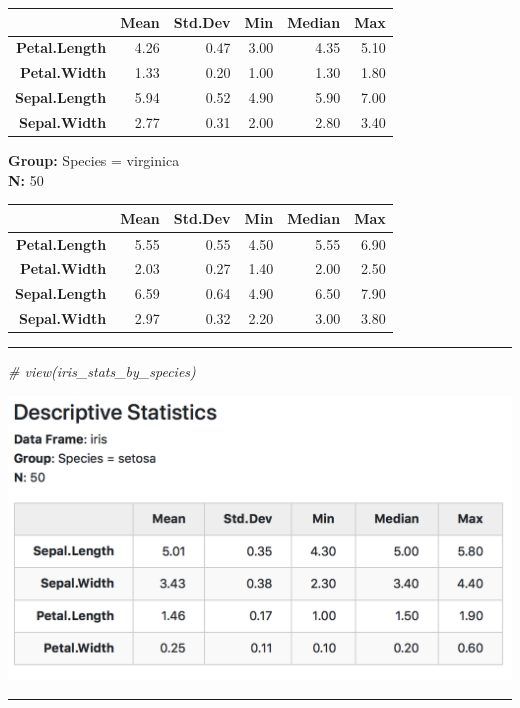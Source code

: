 \documentclass[]{article}
\newenvironment{Shaded}{\begin{snugshade}}{\end{snugshade}}
\newcommand{\CommentTok}[1]{\textcolor[rgb]{0.56,0.35,0.01}{\textit{#1}}}
\begin{document}
\begin{longtable}[]{@{}rrrrrr@{}}
\toprule
~ & Mean & Std.Dev & Min & Median & Max\tabularnewline
\midrule
\endhead
\textbf{Petal.Length} & 4.26 & 0.47 & 3.00 & 4.35 & 5.10\tabularnewline
\textbf{Petal.Width} & 1.33 & 0.20 & 1.00 & 1.30 & 1.80\tabularnewline
\textbf{Sepal.Length} & 5.94 & 0.52 & 4.90 & 5.90 & 7.00\tabularnewline
\textbf{Sepal.Width} & 2.77 & 0.31 & 2.00 & 2.80 & 3.40\tabularnewline
\bottomrule
\end{longtable}

\textbf{Group:} Species = virginica\\
\textbf{N:} 50

\begin{longtable}[]{@{}rrrrrr@{}}
\toprule
~ & Mean & Std.Dev & Min & Median & Max\tabularnewline
\midrule
\endhead
\textbf{Petal.Length} & 5.55 & 0.55 & 4.50 & 5.55 & 6.90\tabularnewline
\textbf{Petal.Width} & 2.03 & 0.27 & 1.40 & 2.00 & 2.50\tabularnewline
\textbf{Sepal.Length} & 6.59 & 0.64 & 4.90 & 6.50 & 7.90\tabularnewline
\textbf{Sepal.Width} & 2.97 & 0.32 & 2.20 & 3.00 & 3.80\tabularnewline
\bottomrule
\end{longtable}

\begin{center}\rule{0.5\linewidth}{\linethickness}\end{center}

\begin{Shaded}
\begin{Highlighting}[]
\CommentTok{# view(iris_stats_by_species)}
\end{Highlighting}
\end{Shaded}

\includegraphics{figures/DescriptiveStatistics.png}

\begin{center}\rule{0.5\linewidth}{\linethickness}\end{center}
\end{document}
